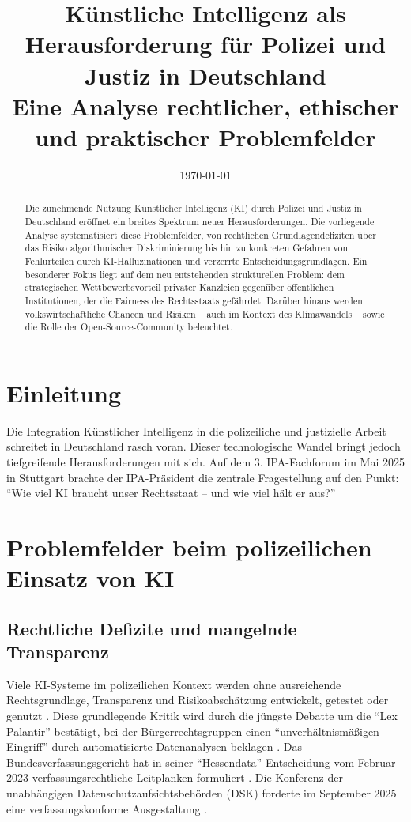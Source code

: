 \documentclass[12pt,a4paper]{article}
\title{Künstliche Intelligenz als Herausforderung für Polizei und Justiz in Deutschland\\
	\large Eine Analyse rechtlicher, ethischer und praktischer Problemfelder}
\author{}
\date{\today}
\begin{document}
	
	\maketitle
	
	\begin{abstract}
		Die zunehmende Nutzung Künstlicher Intelligenz (KI) durch Polizei und Justiz in Deutschland eröffnet ein breites Spektrum neuer Herausforderungen. Die vorliegende Analyse systematisiert diese Problemfelder, von rechtlichen Grundlagendefiziten über das Risiko algorithmischer Diskriminierung bis hin zu konkreten Gefahren von Fehlurteilen durch KI-Halluzinationen und verzerrte Entscheidungsgrundlagen. Ein besonderer Fokus liegt auf dem neu entstehenden strukturellen Problem: dem strategischen Wettbewerbsvorteil privater Kanzleien gegenüber öffentlichen Institutionen, der die Fairness des Rechtsstaats gefährdet. Darüber hinaus werden volkswirtschaftliche Chancen und Risiken – auch im Kontext des Klimawandels – sowie die Rolle der Open-Source-Community beleuchtet.
	\end{abstract}
	
	\tableofcontents
	\newpage
	
	\section{Einleitung}
	
	Die Integration Künstlicher Intelligenz in die polizeiliche und justizielle Arbeit schreitet in Deutschland rasch voran. Dieser technologische Wandel bringt jedoch tiefgreifende Herausforderungen mit sich. Auf dem 3. IPA-Fachforum im Mai 2025 in Stuttgart brachte der IPA-Präsident die zentrale Fragestellung auf den Punkt: \enquote{Wie viel KI braucht unser Rechtsstaat – und wie viel hält er aus?} \cite{IPA2025}
	
	\section{Problemfelder beim polizeilichen Einsatz von KI}
	
	\subsection{Rechtliche Defizite und mangelnde Transparenz}
	
	Viele KI-Systeme im polizeilichen Kontext werden ohne ausreichende Rechtsgrundlage, Transparenz und Risikoabschätzung entwickelt, getestet oder genutzt \cite{Peteranderl2025}. Diese grundlegende Kritik wird durch die jüngste Debatte um die \enquote{Lex Palantir} bestätigt, bei der Bürgerrechtsgruppen einen \enquote{unverhältnismäßigen Eingriff} durch automatisierte Datenanalysen beklagen \cite{FR2026}. Das Bundesverfassungsgericht hat in seiner \enquote{Hessendata}-Entscheidung vom Februar 2023 verfassungsrechtliche Leitplanken formuliert \cite{VerfBlog2026}. Die Konferenz der unabhängigen Datenschutzaufsichtsbehörden (DSK) forderte im September 2025 eine verfassungskonforme Ausgestaltung \cite{DSK2025}.
	
\end{document}
